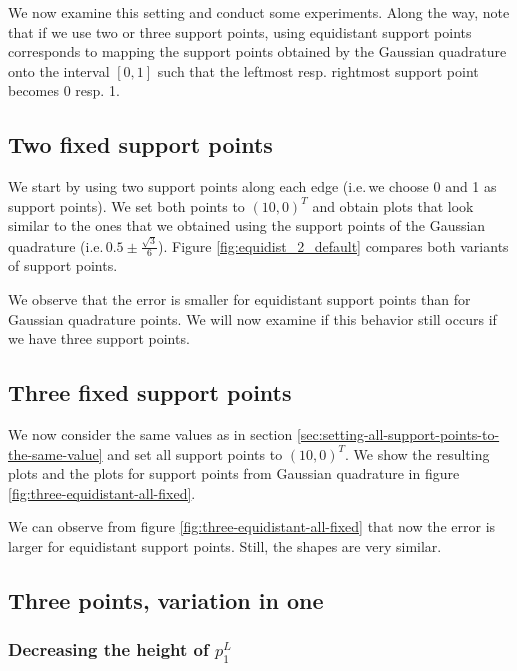 \documentclass[a4paper, twoside]{article}
\begin{document}
We now examine this setting and conduct some experiments. Along the way, note that if we use two or three support points, using equidistant support points corresponds to mapping the support points obtained by the Gaussian quadrature onto the interval $[0,1]$ such that the leftmost resp. rightmost support point becomes 0 resp. 1.

\subsection{Two fixed support points}
\label{sec:equidist-two-fixed}

We start by using two support points along each edge (i.e.\,we choose 0 and 1 as support points). We set both points to $(10,0)^T$ and obtain plots that look similar to the ones that we obtained using the support points of the Gaussian quadrature (i.e.\,$0.5\pm\frac{\sqrt 3}{6}$). Figure \ref{fig:equidist_2_default} compares both variants of support points.



We observe that the error is smaller for equidistant support points than for Gaussian quadrature points. We will now examine if this behavior still occurs if we have three support points.

\subsection{Three fixed support points}
\label{sec:equidistant-three-fixed}

We now consider the same values as in section \ref{sec:setting-all-support-points-to-the-same-value} and set all support points to $(10,0)^T$. We show the resulting plots and the plots for support points from Gaussian quadrature in figure \ref{fig:three-equidistant-all-fixed}.



We can observe from figure \ref{fig:three-equidistant-all-fixed} that now the error is larger for equidistant support points. Still, the shapes are very similar.

\subsection{Three points, variation in one}
\label{sec:equidist-3-one-point-variation}

\subsubsection{Decreasing the height of $p_1^L$}
\label{sec:equidist-3-on-point-var-decr-height-p1}
\end{document}
